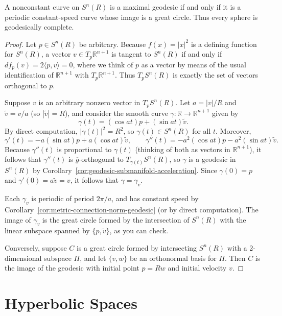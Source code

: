 \begin{proposition}
\label{prop:maximal-geodesic-sphere}

A nonconstant curve on $S^n(R)$ is a maximal geodesic if and only if it is a periodic constant-speed curve whose image is a great circle. Thus every sphere is geodesically complete.

\begin{proof}
Let $p \in S^n(R)$ be arbitrary. Because $f(x) = |x|^2$ is a defining function for $S^n(R)$, a vector $v \in T_p\mathbb{R}^{n+1}$ is tangent to $S^n(R)$ if and only if $df_p(v) = 2\langle p,v \rangle = 0$, where we think of $p$ as a vector by means of the usual identification of $\mathbb{R}^{n+1}$ with $T_p\mathbb{R}^{n+1}$. Thus $T_pS^n(R)$ is exactly the set of vectors orthogonal to $p$.

Suppose $v$ is an arbitrary nonzero vector in $T_pS^n(R)$. Let $a = |v|/R$ and $\tilde{v} = v/a$ (so $|\tilde{v}| = R$), and consider the smooth curve $\gamma: \mathbb{R} \to \mathbb{R}^{n+1}$ given by
\[
\gamma(t) = (\cos at)p + (\sin at)\tilde{v}.
\]
By direct computation, $|\gamma(t)|^2 = R^2$, so $\gamma(t) \in S^n(R)$ for all $t$. Moreover,
\[
\gamma'(t) = -a(\sin at)p + a(\cos at)\tilde{v}, \qquad
\gamma''(t) = -a^2(\cos at)p - a^2(\sin at)\tilde{v}.
\]
Because $\gamma''(t)$ is proportional to $\gamma(t)$ (thinking of both as vectors in $\mathbb{R}^{n+1}$), it follows that $\gamma''(t)$ is $\overline{g}$-orthogonal to $T_{\gamma(t)}S^n(R)$, so $\gamma$ is a geodesic in $S^n(R)$ by Corollary~\ref{cor:geodesic-submanifold-acceleration}. Since $\gamma(0) = p$ and $\gamma'(0) = a\tilde{v} = v$, it follows that $\gamma = \gamma_v$.

Each $\gamma_v$ is periodic of period $2\pi/a$, and has constant speed by Corollary~\ref{cor:metric-connection-norm-geodesic} (or by direct computation). The image of $\gamma_v$ is the great circle formed by the intersection of $S^n(R)$ with the linear subspace spanned by $\{p, \tilde{v}\}$, as you can check.

Conversely, suppose $C$ is a great circle formed by intersecting $S^n(R)$ with a 2-dimensional subspace $\Pi$, and let $\{v, w\}$ be an orthonormal basis for $\Pi$. Then $C$ is the image of the geodesic with initial point $p = Rw$ and initial velocity $v$.
\end{proof}
\end{proposition}

\section{Hyperbolic Spaces}

